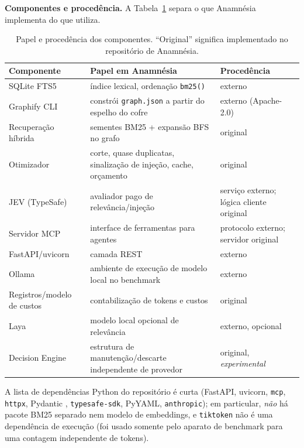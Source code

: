 \documentclass[conference,onecolumn,11pt]{IEEEtran}
\newcommand{\anam}{Anam\-n\'esia}
\begin{document}
\textbf{Componentes e procedência.} A Tabela~\ref{tab:credits} separa o que \anam{} implementa do que utiliza.

\begin{table}[t]\caption{Papel e procedência dos componentes. ``Original'' significa implementado no repositório de \anam{}.}\label{tab:credits}\centering\footnotesize\setlength{\tabcolsep}{3pt}
\begin{tabularx}{\columnwidth}{@{}p{}Xp{}@{}}\toprule
Componente & Papel em \anam{} & Procedência\\\midrule
SQLite FTS5 & índice lexical, ordenação \texttt{bm25()} \cite{sqlitefts5} & externo\\
Graphify CLI & constrói \texttt{graph.json} a partir do espelho do cofre \cite{graphify} & externo (Apache-2.0)\\
Recuperação híbrida & sementes BM25 + expansão BFS no grafo & original\\
Otimizador & corte, quase duplicatas, sinalização de injeção, cache, orçamento & original\\
JEV (TypeSafe) & avaliador pago de relevância/injeção \cite{typesafedocs} & serviço externo; lógica cliente original\\
Servidor MCP & interface de ferramentas para agentes \cite{mcpspec} & protocolo externo; servidor original\\
FastAPI/\allowbreak uvicorn & camada REST \cite{fastapi} & externo\\
Ollama & ambiente de execução de modelo local no benchmark \cite{ollama} & externo\\
Registros/\allowbreak modelo de custos & contabilização de tokens e custos & original\\
Laya & modelo local opcional de relevância \cite{laya} & externo, opcional\\
Decision Engine & estrutura de manutenção/descarte independente de provedor & original, \emph{experimental}\\\bottomrule
\end{tabularx}\end{table}

A lista de dependências Python do repositório é curta (FastAPI, uvicorn, \texttt{mcp}, \texttt{httpx}, Pydantic \cite{pydantic}, \texttt{typesafe-sdk}, PyYAML, \texttt{anthropic}); em particular, \emph{não} há pacote BM25 separado nem modelo de embeddings, e \texttt{tiktoken} \cite{tiktoken} não é uma dependência de execução (foi usado somente pelo aparato de benchmark para uma contagem independente de tokens).
\end{document}
